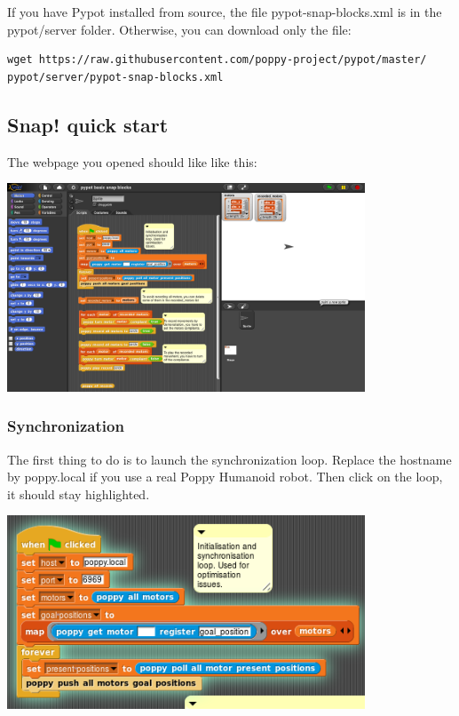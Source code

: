 \documentclass{article}
\begin{document}
If you have Pypot installed from source, the file pypot-snap-blocks.xml is in the pypot/server folder. Otherwise, you can download only the file:
\begin{verbatim}
wget https://raw.githubusercontent.com/poppy-project/pypot/master/
pypot/server/pypot-snap-blocks.xml
\end{verbatim}

\subsection{Snap! quick start}

The webpage you opened should like like this:

 \begin{center}
  \includegraphics[width=0.8\textwidth]{img/snap_full}
 \end{center}

\subsubsection{Synchronization}

The first thing to do is to launch the synchronization loop. Replace the hostname by poppy.local if you use a real Poppy Humanoid robot. Then click on the loop, it should stay highlighted.

 \begin{center}
  \includegraphics[width=0.8\textwidth]{img/snap_full_selected}
 \end{center}
\end{document}
